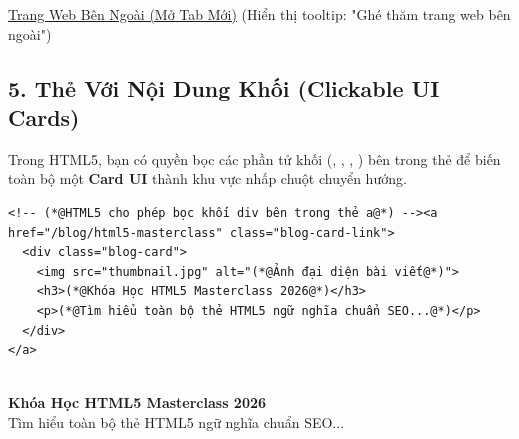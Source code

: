 \begin{browserWindow}
\sffamily\small
\textcolor{primaryBlue}{\underline{Trang Web Bên Ngoài (Mở Tab Mới)}} \;\; \textcolor{gray!70}{\small(Hiển thị tooltip: "Ghé thăm trang web bên ngoài")}
\end{browserWindow}

\subsection{5. Thẻ  Với Nội Dung Khối (Clickable UI Cards)}
Trong HTML5, bạn có quyền bọc các phần tử khối (, , , ) bên trong thẻ  để biến toàn bộ một \textbf{Card UI} thành khu vực nhấp chuột chuyển hướng.

\begin{codeWindow}
\begin{lstlisting}[language=HTML5]
<!-- (*@HTML5 cho phép bọc khối div bên trong thẻ a@*) --><a href="/blog/html5-masterclass" class="blog-card-link">
  <div class="blog-card">
    <img src="thumbnail.jpg" alt="(*@Ảnh đại diện bài viết@*)">
    <h3>(*@Khóa Học HTML5 Masterclass 2026@*)</h3>
    <p>(*@Tìm hiểu toàn bộ thẻ HTML5 ngữ nghĩa chuẩn SEO...@*)</p>
  </div>
</a>
\end{lstlisting}
\end{codeWindow}

\begin{browserWindow}
\sffamily\small
\begin{tcolorbox}[colback=white, colframe=primaryBlue!30, arc=6pt, drop shadow=black!6!white]
 \\[4pt]
{\bfseries\color{primaryBlue} Khóa Học HTML5 Masterclass 2026}\\[2pt]
{\small Tìm hiểu toàn bộ thẻ HTML5 ngữ nghĩa chuẩn SEO...}
\end{tcolorbox}
\end{browserWindow}

